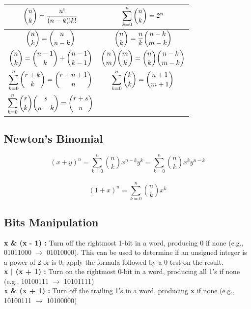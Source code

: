 \documentclass[10pt, twocolumn]{article}
\begin{document}
\begin{flushleft}
\begin{table}[H]
\setlength{\tabcolsep}{36pt}
\begin{tabular}{|c|c|}

\hline
$\mathlarger{\binom{n}{k} = \frac{n!}{(n-k)!k!}}$ & $\mathlarger{\sum_{k=0}^{n} \binom{n}{k}} = 2^n$ \\

\hline
$\mathlarger{\binom{n}{k} = \binom{n}{n - k}}$ &
$\mathlarger{\binom{n}{k} = \frac{n}{k}\binom{n-k}{m-k}}$ \\

\hline
$\mathlarger{\binom{n}{k} = \binom{n-1}{k} + \binom{n-1}{k-1}}$ &
$\mathlarger{\binom{n}{m}\binom{m}{k} = \binom{n}{k}\binom{n-k}{m-k}}$ \\

\hline
$\mathlarger{\sum_{k=0}^{n} \binom{r+k}{k} = \binom{r+n+1}{n}}$ &
$\mathlarger{\sum_{k=0}^{n} \binom{k}{k} = \binom{n+1}{m+1}}$ \\

\hline
$\mathlarger{\sum_{k=0}^{n} \binom{r}{k}\binom{s}{n-k} = \binom{r+s}{n}}$ & \\
\hline

\end{tabular}
\end{table}

\subsection{Newton's Binomial}

$$(x + y)^{n} = \sum_{k=0}^{n} \binom{n}{k} x^{n-k} y^{k} = \sum_{k=0}^{n} \binom{n}{k} x^{k} y^{n-k} $$\\
$$(1 + x)^{n} = \sum_{k=0}^{n} \binom{n}{k} x^{k}$$

\subsection{Bits Manipulation}
\textbf{x \& (x - 1) :} Turn off the rightmost 1-bit in a word, producing 0 if none (e.g., 01011000 $\rightarrow$ 01010000). This can be used to determine if an unsigned integer is a power of 2 or is 0: apply the formula followed by a 0-test on the result.\\[0.2cm]

\textbf{x | (x + 1) :} Turn on the rightmost 0-bit in a word, producing all 1's if none (e.g., 10100111 $\rightarrow$ 10101111)\\[0.2cm]

\textbf{x \& (x + 1) :} Turn off the trailing 1's in a word, producing \textbf{x} if none (e.g., 10100111 $\rightarrow$ 10100000)\\[0.2cm]


\end{flushleft}
\end{document}
